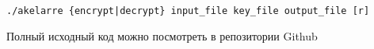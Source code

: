 \documentclass[12pt, a4paper]{article}
\begin{document}
\begin{lstlisting}
./akelarre {encrypt|decrypt} input_file key_file output_file [r]
\end{lstlisting}

Полный исходный код можно посмотреть в репозитории Github \autocite{github}

\newpage


\nocite{*}
\printbibliography[%
   heading=bibintoc%
    ,title={Список использованных источников} %
]
\end{document}
